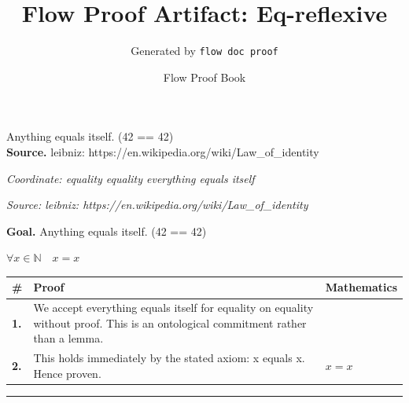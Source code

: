\documentclass[11pt]{article}
\title{Flow Proof Artifact: Eq-reflexive}
\author{Generated by \texttt{flow doc proof}}
\date{Flow Proof Book}
\theoremstyle{definition}
\begin{document}
\maketitle
Anything equals itself.  (42 == 42)\\[0.5em]
\textbf{Source.} leibniz: https://en.wikipedia.org/wiki/Law\_of\_identity\\[0.5em]
\bigskip
{}\par
\smallskip\noindent\textit{Coordinate: equality \cdot equality \cdot everything equals itself}\par
\smallskip\noindent\textit{Source: leibniz: https://en.wikipedia.org/wiki/Law\_of\_identity}\par
\medskip
\noindent\textbf{Goal.} Anything equals itself.  (42 == 42)\par
\noindent$\displaystyle \forall x \in \mathbb{N}\quad x = x$\par
\medskip
\noindent
\begin{tabular}{@{} >{\raggedright\arraybackslash}p{} >{\raggedright\arraybackslash}p{} >{\raggedleft\arraybackslash}p{} @{}}
\textbf{\#} & \textbf{Proof} & \textbf{Mathematics} \\
\midrule
\textbf{1.} & We accept everything equals itself for equality on equality without proof. This is an ontological commitment rather than a lemma. & \\[0.45em]
\textbf{2.} & This holds immediately by the stated axiom: x equals x. Hence proven. & $\displaystyle x = x$ \\[0.45em]
\bottomrule
\end{tabular}
\label{thm:Eq-equality-everything_equals_itself}
\par\medskip\hrule
\end{document}
